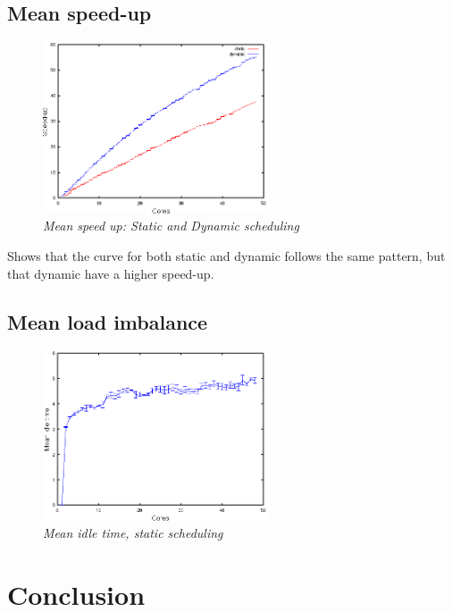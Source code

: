 \documentclass[a4paper,12pt]{article}
\begin{document}
\subsection{Mean speed-up}
\label{sec:speed}
\begin{figure}[h!]
\centering
\includegraphics[width=0.6\textwidth]{mean-speed-up-both}
\caption{\emph{Mean speed up: Static and Dynamic scheduling}}
\label{fig:mean-speed-up-both}
\end{figure}

Shows that the curve for both static and dynamic follows the same pattern, but that dynamic have a higher speed-up. 

\newpage

\subsection{Mean load imbalance}
\begin{figure}[h!]
\centering
\includegraphics[width=0.6\textwidth]{load-imbalance}
\caption{\emph{Mean idle time, static scheduling}}
\label{fig:load-imbalance}
\end{figure}


\section{Conclusion}
\label{sec:conclusion}
\end{document}
